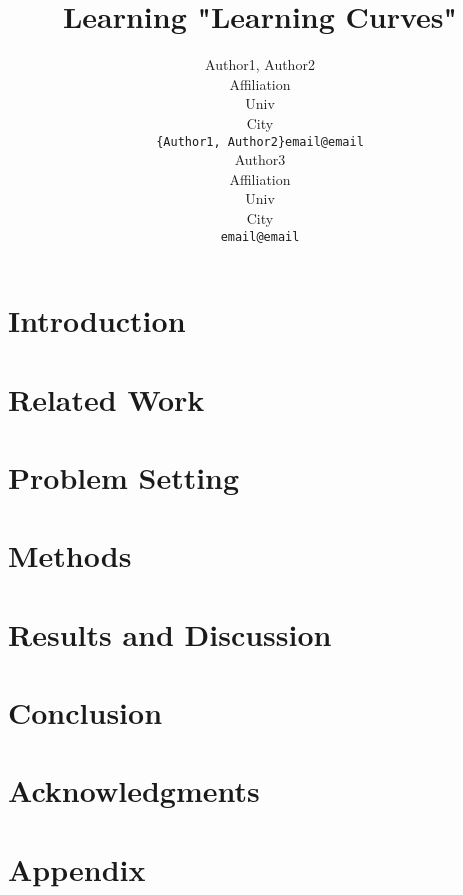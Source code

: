 \documentclass{article}
\title{Learning "Learning Curves"}
\author{
  Author1, Author2 \\
  Affiliation \\
  Univ \\
  City\\
  \texttt{\{Author1, Author2\}email@email} \\
   \And
  Author3 \\
  Affiliation \\
  Univ \\
  City\\
  \texttt{email@email} \\
}
\newcommand{\version}{v1/}
\begin{document}
\maketitle


\begin{abstract}
  
\end{abstract}



\section{Introduction}\label{sec:intro}
  
\section{Related Work}\label{sec:rw}
  
\section{Problem Setting}\label{sec:prob}
  
\section{Methods}\label{sec:meth}
  
\section{Results and Discussion}\label{sec:resdis}
  
\section{Conclusion}\label{sec:conc}
  
\section*{Acknowledgments}
  
  
\newpage
\section{Appendix}\label{sec:conc}
  
\end{document}
